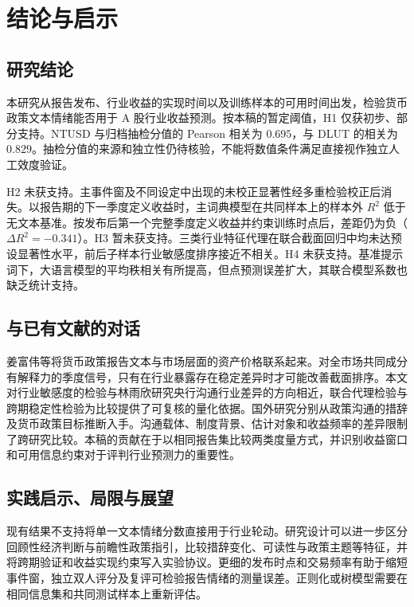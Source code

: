 \section{结论与启示}\label{sec:conclusion}

\subsection{研究结论}
本研究从报告发布、行业收益的实现时间以及训练样本的可用时间出发，检验货币政策文本情绪能否用于 A 股行业收益预测。按本稿的暂定阈值，H1 仅获初步、部分支持。NTUSD 与归档抽检分值的 Pearson 相关为 $0.695$，与 DLUT 的相关为 $0.829$。抽检分值的来源和独立性仍待核验，不能将数值条件满足直接视作独立人工效度验证。

H2 未获支持。主事件窗及不同设定中出现的未校正显著性经多重检验校正后消失。以报告期的下一季度定义收益时，主词典模型在共同样本上的样本外 $R^2$ 低于无文本基准。按发布后第一个完整季度定义收益并约束训练时点后，差距仍为负（$\Delta R^2=-0.341$）。H3 暂未获支持。三类行业特征代理在联合截面回归中均未达预设显著性水平，前后子样本行业敏感度排序接近不相关。H4 未获支持。基准提示词下，大语言模型的平均秩相关有所提高，但点预测误差扩大，其联合模型系数也缺乏统计支持。

\subsection{与已有文献的对话}
姜富伟等将货币政策报告文本与市场层面的资产价格联系起来\cite{jiangHuHuang2021}。对全市场共同成分有解释力的季度信号，只有在行业暴露存在稳定差异时才可能改善截面排序。本文对行业敏感度的检验与林雨欣研究央行沟通行业差异的方向相近\cite{linYuxin2025}，联合代理检验与跨期稳定性检验为比较提供了可复核的量化依据。国外研究分别从政策沟通的措辞及货币政策目标推断入手\cite{luccaTrebbi2009,shapiroWilson2022}。沟通载体、制度背景、估计对象和收益频率的差异限制了跨研究比较。本稿的贡献在于以相同报告集比较两类度量方式，并识别收益窗口和可用信息约束对于评判行业预测力的重要性。

\subsection{实践启示、局限与展望}
现有结果不支持将单一文本情绪分数直接用于行业轮动。研究设计可以进一步区分回顾性经济判断与前瞻性政策指引，比较措辞变化、可读性与政策主题等特征，并将跨期验证和收益实现约束写入实验协议。更细的发布时点和交易频率有助于缩短事件窗，独立双人评分及复评可检验报告情绪的测量误差。正则化或树模型需要在相同信息集和共同测试样本上重新评估。

